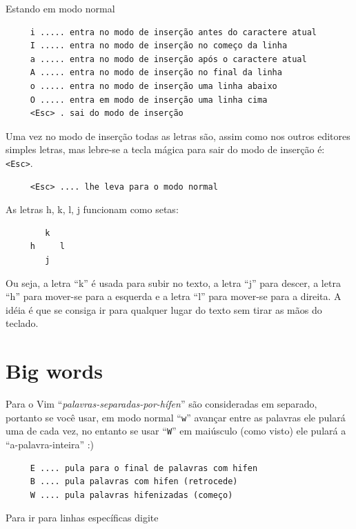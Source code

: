 \documentclass[10pt,a4paper,openany]{book}
\begin{document}
Estando em modo normal

\begin{verbatim}
     i ..... entra no modo de inserção antes do caractere atual
     I ..... entra no modo de inserção no começo da linha
     a ..... entra no modo de inserção após o caractere atual
     A ..... entra no modo de inserção no final da linha
     o ..... entra no modo de inserção uma linha abaixo
     O ..... entra em modo de inserção uma linha cima
     <Esc> . sai do modo de inserção
\end{verbatim}

Uma vez no modo de inserção todas as letras são, assim como nos outros
editores simples letras, mas lebre-se a tecla mágica para sair do modo
de inserção é: \verb+<Esc>+.

\begin{verbatim}
     <Esc> .... lhe leva para o modo normal
\end{verbatim}

As letras h, k, l, j funcionam como setas:

\begin{verbatim}
        k
     h     l
        j
\end{verbatim}

Ou seja, a letra ``k'' é usada para subir no texto, a letra ``j'' para
descer, a letra ``h'' para mover-se para a esquerda e a letra ``l''
para mover-se para a direita. A idéia é que se consiga ir para
qualquer lugar do texto sem tirar as mãos do teclado.



\section{Big words}
\label{Big word's}

Para o Vim ``{\em{palavras-separadas-por-hífen}}'' são consideradas em separado, portanto se você usar,
em modo normal ``\verb+w+'' avançar entre as palavras ele pulará uma de
cada vez, no entanto se usar ``\verb+W+''
em maiúsculo (como visto) ele pulará a ``a-palavra-inteira'' :)

\begin{verbatim}
     E .... pula para o final de palavras com hifen
     B .... pula palavras com hifen (retrocede)
     W .... pula palavras hifenizadas (começo)
\end{verbatim}



Para ir para linhas específicas digite
\end{document}
